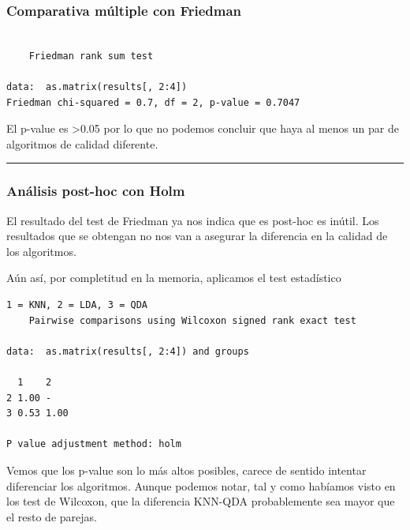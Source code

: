 \documentclass[
]{article}
\begin{document}
\hypertarget{comparativa-muxfaltiple-con-friedman}{%
\subsubsection{Comparativa múltiple con
Friedman}\label{comparativa-muxfaltiple-con-friedman}}

\begin{verbatim}

    Friedman rank sum test

data:  as.matrix(results[, 2:4])
Friedman chi-squared = 0.7, df = 2, p-value = 0.7047
\end{verbatim}

El p-value es \textgreater0.05 por lo que no podemos concluir que haya
al menos un par de algoritmos de calidad diferente.

\begin{center}\rule{0.5\linewidth}{0.5pt}\end{center}

\hypertarget{anuxe1lisis-post-hoc-con-holm}{%
\subsubsection{Análisis post-hoc con
Holm}\label{anuxe1lisis-post-hoc-con-holm}}

El resultado del test de Friedman ya nos indica que es post-hoc es
inútil. Los resultados que se obtengan no nos van a asegurar la
diferencia en la calidad de los algoritmos.

Aún así, por completitud en la memoria, aplicamos el test estadístico

\begin{verbatim}
1 = KNN, 2 = LDA, 3 = QDA
    Pairwise comparisons using Wilcoxon signed rank exact test 

data:  as.matrix(results[, 2:4]) and groups 

  1    2   
2 1.00 -   
3 0.53 1.00

P value adjustment method: holm 
\end{verbatim}

Vemos que los p-value son lo más altos posibles, carece de sentido
intentar diferenciar los algoritmos. Aunque podemos notar, tal y como
habíamos visto en los test de Wilcoxon, que la diferencia KNN-QDA
probablemente sea mayor que el resto de parejas.
\end{document}
